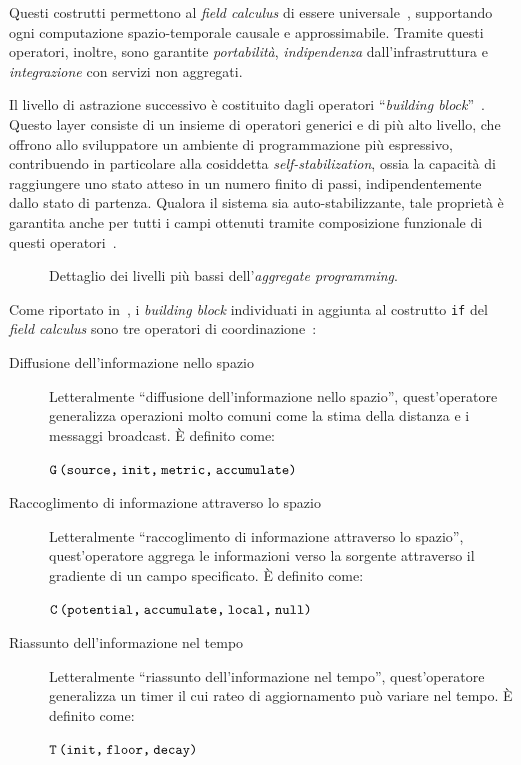 Questi costrutti permettono al \emph{field calculus} di essere universale~\cite{10.1007/978-3-319-92408-3_1},
supportando ogni computazione spazio-temporale causale e approssimabile.
Tramite questi operatori, inoltre, sono garantite \emph{portabilità}, \emph{indipendenza} dall'infrastruttura e \emph{integrazione} con servizi non aggregati.

Il livello di astrazione successivo è costituito dagli operatori ``\emph{building block}''~\cite{BV-FOCAS2014}.
Questo layer consiste di un insieme di operatori generici e di più alto livello, che offrono allo sviluppatore un ambiente di programmazione più espressivo,
contribuendo in particolare alla cosiddetta \emph{self-stabilization}, ossia la capacità di raggiungere uno stato atteso in un numero finito di passi,
indipendentemente dallo stato di partenza.
Qualora il sistema sia auto-stabilizzante, tale proprietà è garantita anche per tutti i campi ottenuti tramite composizione funzionale di questi operatori~\cite{BV-FOCAS2014}.

\begin{figure}[htbp]
  \centering
  \caption{Dettaglio dei livelli più bassi dell'\emph{aggregate programming}.}%
  \label{fig:stack-detail}
\end{figure}

Come riportato in~, i \emph{building block} individuati in aggiunta al costrutto \texttt{if} del \emph{field calculus} sono tre operatori di coordinazione~\cite{7274429,BV-FOCAS2014}:

\begin{description}
  \item[Diffusione dell'informazione nello spazio]
    Letteralmente \enquote{diffusione dell'informazione nello spazio},
    quest'operatore generalizza operazioni molto comuni come la stima della distanza e i messaggi broadcast.
    È definito come:

    \(\texttt{G\,(source,\:init,\:metric,\:accumulate)}\)

  \item[Raccoglimento di informazione attraverso lo spazio]
    Letteralmente \enquote{raccoglimento di informazione attraverso lo spazio},
    quest'operatore aggrega le informazioni verso la sorgente attraverso il gradiente di un campo specificato.
    È definito come:

    \(\texttt{C\,(potential,\:accumulate,\:local,\:null)}\)

  \item[Riassunto dell'informazione nel tempo]
    Letteralmente \enquote{riassunto dell'informazione nel tempo},
    quest'operatore generalizza un timer il cui rateo di aggiornamento può variare nel tempo.
    È definito come:

    \(\texttt{T\,(init,\:floor,\:decay)}\)
\end{description}

